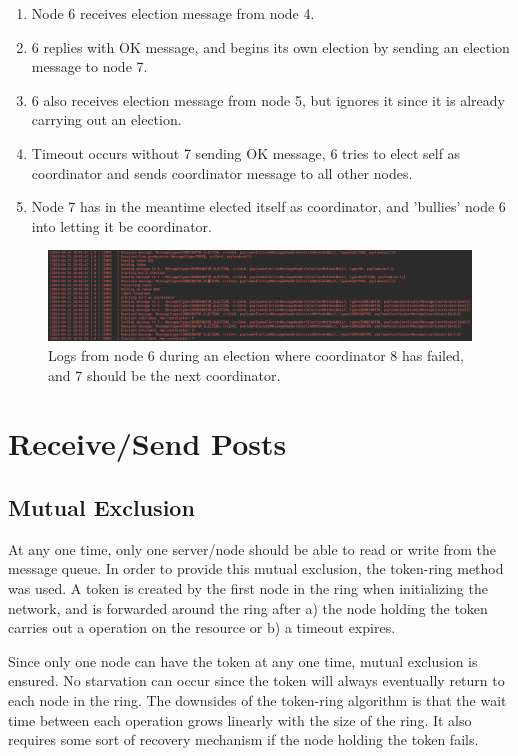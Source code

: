 \documentclass[12pt]{article}
\begin{document}
\begin{enumerate}
	\item Node 6 receives election message from node 4.
	\item 6 replies with OK message, and begins its own election by sending an election message to node 7.
	\item 6 also receives election message from node 5, but ignores it since it is already carrying out an election.
	\item Timeout occurs without 7 sending OK message, 6 tries to elect self as coordinator and sends coordinator message to all other nodes.
	\item Node 7 has in the meantime elected itself as coordinator, and 'bullies' node 6 into letting it be coordinator.
\end{enumerate}

\begin{figure}[!ht]
	\centering
	\includegraphics[width=\linewidth]{images/bully}
	\caption{Logs from node 6 during an election where coordinator 8 has failed, and 7 should be the next coordinator.}
	\label{fig:bully}
\end{figure}

\section{Receive/Send Posts}

\subsection{Mutual Exclusion}

At any one time, only one server/node should be able to read or write from the message queue. In order to provide this mutual exclusion, the token-ring method was used. A token is created by the first node in the ring when initializing the network, and is forwarded around the ring after a) the node holding the token carries out a operation on the resource or b) a timeout expires. 

Since only one node can have the token at any one time, mutual exclusion is ensured. No starvation can occur since the token will always eventually return to each node in the ring. The downsides of the token-ring algorithm is that the wait time between each operation grows linearly with the size of the ring. It also requires some sort of recovery mechanism if the node holding the token fails.
\end{document}
